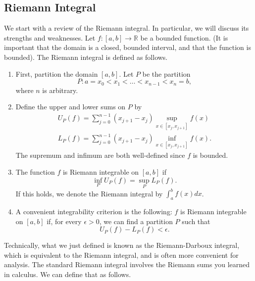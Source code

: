 \documentclass[12pt]{amsart}         %
\theoremstyle{remark}
\newcommand{\R}{\mathbb{R}}
\begin{document}
\subsection{Riemann Integral}

We start with a review of the Riemann integral. In particular, we will discuss its strengths and weaknesses. Let $f: [a, b] \rightarrow \R$ be a bounded function. (It is important that the domain is a closed, bounded interval, and that the function is bounded). The Riemann integral is defined as follows.
\begin{enumerate}
    \item First, partition the domain $[a,b]$. Let $P$ be the partition
    \[
    P: a = x_0 < x_1 < \dots < x_{n-1} < x_n = b,
    \]
    where $n$ is arbitrary.
    \item Define the upper and lower sums on $P$ by
    \begin{align*}
        U_P(f) = \sum_{j = 0}^{n-1} (x_{j+1} - x_j) \sup_{x \in [x_j, x_{j+1}]} f(x) \\
        L_P(f) = \sum_{j = 0}^{n-1} (x_{j+1} - x_j) \inf_{x \in [x_j, x_{j+1}]} f(x).
    \end{align*}
    The supremum and infimum are both well-defined since $f$ is bounded.
    \item The function $f$ is Riemann integrable on $[a,b]$ if
    \[
    \inf_P U_P(f) = \sup_P L_P(f).
    \]
    If this holds, we denote the Riemann integral by $\int_a^b f(x) dx$.
    \item A convenient integrability criterion is the following: $f$ is Riemann integrable on $[a, b]$ if, for every $\epsilon > 0$, we can find a partition $P$ such that
    \[
    U_P(f) - L_P(f) < \epsilon.
    \]
\end{enumerate}
Technically, what we just defined is known as the Riemann-Darboux integral, which is equivalent to the Riemann integral, and is often more convenient for analysis. The standard Riemann integral involves the Riemann sums you learned in calculus. We can define that as follows.
\end{document}

